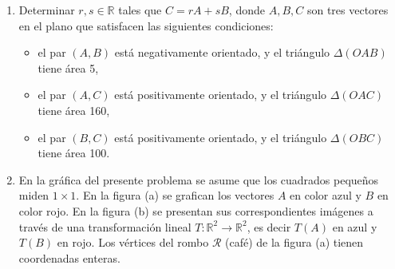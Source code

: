 \documentclass[11pt]{article}
\newcommand{\vect}[2]{\begin{pmatrix}#1\\#2\end{pmatrix}}
\begin{document}
\begin{enumerate}

\item Determinar $r,s\in\mathbb{R}$ tales que $C=rA+sB$, donde $A,B,C$ son tres vectores en el plano que satisfacen las siguientes condiciones:
\begin{itemize}
\item el par $(A,B)$ está negativamente orientado, y el triángulo $\Delta(OAB)$ tiene área 5,
\item el par $(A,C)$ está positivamente orientado, y el triángulo $\Delta(OAC)$ tiene área 160,
\item el par $(B,C)$ está positivamente orientado, y el triángulo $\Delta(OBC)$ tiene área 100.
\end{itemize}

\item En la gráfica del presente problema se asume que los cuadrados pequeños miden $1\times 1$. En la figura (a) se grafican los vectores $A$ en color azul y $B$ en color rojo. En la figura (b) se presentan sus correspondientes imágenes a través de una transformación lineal $T:\mathbb{R}^2\to\mathbb{R}^2$, es decir $T(A)$ en azul y $T(B)$ en rojo. Los vértices del rombo $\mathcal{R}$ (café) de la figura (a) tienen coordenadas enteras.

\begin{center}
\hspace{1cm}
\end{center}


\end{enumerate}
\end{document}
